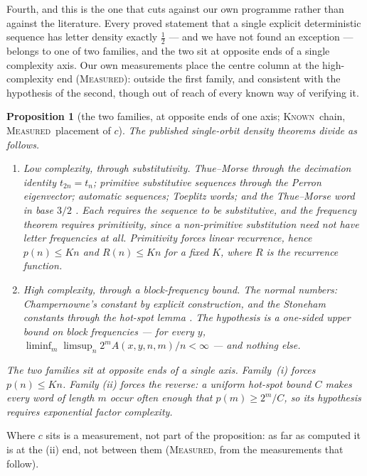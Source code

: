 \documentclass[11pt]{article}
\newtheorem{proposition}[theorem]{Proposition}
\theoremstyle{definition}
\theoremstyle{remark}
\newcommand{\MEASURED}{\textsc{Measured}}
\newcommand{\KNOWN}{\textsc{Known}}
\begin{document}
Fourth, and this is the one that cuts against our own programme rather than against the literature.
Every proved statement that a single explicit deterministic sequence has letter density exactly
$\tfrac12$ --- and we have not found an exception --- belongs to one of two families, and the two sit at
opposite ends of a single complexity axis. Our own measurements place the centre column at the
high-complexity end (\MEASURED): outside the first family, and consistent with the hypothesis of the
second, though out of reach of every known way of verifying it.

\begin{proposition}[the two families, at opposite ends of one axis; \KNOWN\ chain, \MEASURED\ placement of $c$]\label{p2:twofamilies}
The published single-orbit density theorems divide as follows.
\begin{enumerate}[nosep]
\item[\textbf{(i)}] \emph{Low complexity, through substitutivity.} Thue--Morse through the decimation
identity $t_{2n}=t_n$; primitive substitutive sequences through the Perron eigenvector; automatic
sequences; Toeplitz words; and the Thue--Morse word in base $3/2$ \cite[Thm.~18]{CERS}. Each requires
the sequence to be substitutive, and the frequency theorem requires \emph{primitivity}, since a
non-primitive substitution need not have letter frequencies at all. Primitivity forces linear
recurrence, hence $p(n)\le Kn$ and $R(n)\le Kn$ for a fixed $K$, where $R$ is the recurrence function.
\item[\textbf{(ii)}] \emph{High complexity, through a block-frequency bound.} The normal numbers:
Champernowne's constant by explicit construction, and the Stoneham constants through the hot-spot
lemma \cite{BM}. The hypothesis is a one-sided upper bound on block frequencies --- for every $y$,
$\liminf_m\limsup_n 2^mA(x,y,n,m)/n<\infty$ --- and nothing else.
\end{enumerate}
The two families sit at opposite ends of a single axis. Family~\textup{(i)} forces $p(n)\le Kn$. Family
\textup{(ii)} forces the reverse: a uniform hot-spot bound $C$ makes every word of length $m$ occur
often enough that $p(m)\ge2^m/C$, so its hypothesis \emph{requires} exponential factor complexity.
\end{proposition}
\noindent Where $c$ sits is a measurement, not part of the proposition: as far as computed it is at the \textup{(ii)} end, not between them (\MEASURED, from the measurements that follow).
\end{document}
